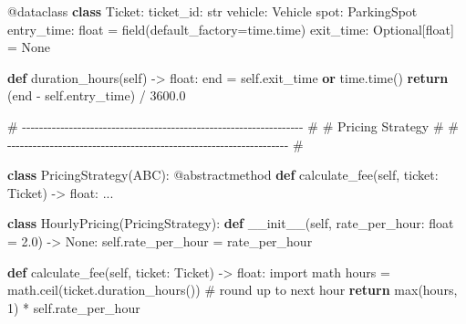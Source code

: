 \documentclass[11pt]{article}
\newenvironment{Shaded}{\begin{snugshade}}{\end{snugshade}}
\newcommand{\AttributeTok}[1]{\textcolor[rgb]{0.16,0.50,0.73}{#1}}
\newcommand{\BuiltInTok}[1]{\textcolor[rgb]{0.50,0.55,0.55}{#1}}
\newcommand{\CommentTok}[1]{\textcolor[rgb]{0.48,0.49,0.49}{#1}}
\newcommand{\ControlFlowTok}[1]{\textcolor[rgb]{0.99,0.74,0.29}{\textbf{#1}}}
\newcommand{\DecValTok}[1]{\textcolor[rgb]{0.96,0.45,0.00}{#1}}
\newcommand{\FloatTok}[1]{\textcolor[rgb]{0.96,0.45,0.00}{#1}}
\newcommand{\FunctionTok}[1]{\textcolor[rgb]{0.56,0.27,0.68}{#1}}
\newcommand{\ImportTok}[1]{\textcolor[rgb]{0.15,0.68,0.38}{#1}}
\newcommand{\KeywordTok}[1]{\textcolor[rgb]{0.81,0.81,0.76}{\textbf{#1}}}
\newcommand{\NormalTok}[1]{\textcolor[rgb]{0.81,0.81,0.76}{#1}}
\newcommand{\OperatorTok}[1]{\textcolor[rgb]{0.81,0.81,0.76}{#1}}
\newcommand{\VariableTok}[1]{\textcolor[rgb]{0.15,0.68,0.68}{#1}}
\begin{document}
\begin{Shaded}
\begin{Highlighting}[]
\AttributeTok{@dataclass}
\KeywordTok{class}\NormalTok{ Ticket:}
\NormalTok{    ticket\_id: }\BuiltInTok{str}
\NormalTok{    vehicle: Vehicle}
\NormalTok{    spot: ParkingSpot}
\NormalTok{    entry\_time: }\BuiltInTok{float} \OperatorTok{=}\NormalTok{ field(default\_factory}\OperatorTok{=}\NormalTok{time.time)}
\NormalTok{    exit\_time: Optional[}\BuiltInTok{float}\NormalTok{] }\OperatorTok{=} \VariableTok{None}

    \KeywordTok{def}\NormalTok{ duration\_hours(}\VariableTok{self}\NormalTok{) }\OperatorTok{{-}\textgreater{}} \BuiltInTok{float}\NormalTok{:}
\NormalTok{        end }\OperatorTok{=} \VariableTok{self}\NormalTok{.exit\_time }\KeywordTok{or}\NormalTok{ time.time()}
        \ControlFlowTok{return}\NormalTok{ (end }\OperatorTok{{-}} \VariableTok{self}\NormalTok{.entry\_time) }\OperatorTok{/} \FloatTok{3600.0}


\CommentTok{\# {-}{-}{-}{-}{-}{-}{-}{-}{-}{-}{-}{-}{-}{-}{-}{-}{-}{-}{-}{-}{-}{-}{-}{-}{-}{-}{-}{-}{-}{-}{-}{-}{-}{-}{-}{-}{-}{-}{-}{-}{-}{-}{-}{-}{-}{-}{-}{-}{-}{-}{-}{-}{-}{-}{-}{-}{-}{-}{-}{-}{-}{-}{-}{-}{-}{-} \#}
\CommentTok{\# Pricing Strategy                                                    \#}
\CommentTok{\# {-}{-}{-}{-}{-}{-}{-}{-}{-}{-}{-}{-}{-}{-}{-}{-}{-}{-}{-}{-}{-}{-}{-}{-}{-}{-}{-}{-}{-}{-}{-}{-}{-}{-}{-}{-}{-}{-}{-}{-}{-}{-}{-}{-}{-}{-}{-}{-}{-}{-}{-}{-}{-}{-}{-}{-}{-}{-}{-}{-}{-}{-}{-}{-}{-}{-} \#}

\KeywordTok{class}\NormalTok{ PricingStrategy(ABC):}
    \AttributeTok{@abstractmethod}
    \KeywordTok{def}\NormalTok{ calculate\_fee(}\VariableTok{self}\NormalTok{, ticket: Ticket) }\OperatorTok{{-}\textgreater{}} \BuiltInTok{float}\NormalTok{:}
\NormalTok{        ...}


\KeywordTok{class}\NormalTok{ HourlyPricing(PricingStrategy):}
    \KeywordTok{def} \FunctionTok{\_\_init\_\_}\NormalTok{(}\VariableTok{self}\NormalTok{, rate\_per\_hour: }\BuiltInTok{float} \OperatorTok{=} \FloatTok{2.0}\NormalTok{) }\OperatorTok{{-}\textgreater{}} \VariableTok{None}\NormalTok{:}
        \VariableTok{self}\NormalTok{.rate\_per\_hour }\OperatorTok{=}\NormalTok{ rate\_per\_hour}

    \KeywordTok{def}\NormalTok{ calculate\_fee(}\VariableTok{self}\NormalTok{, ticket: Ticket) }\OperatorTok{{-}\textgreater{}} \BuiltInTok{float}\NormalTok{:}
        \ImportTok{import}\NormalTok{ math}
\NormalTok{        hours }\OperatorTok{=}\NormalTok{ math.ceil(ticket.duration\_hours())  }\CommentTok{\# round up to next hour}
        \ControlFlowTok{return} \BuiltInTok{max}\NormalTok{(hours, }\DecValTok{1}\NormalTok{) }\OperatorTok{*} \VariableTok{self}\NormalTok{.rate\_per\_hour}



\end{Highlighting}
\end{Shaded}
\end{document}

